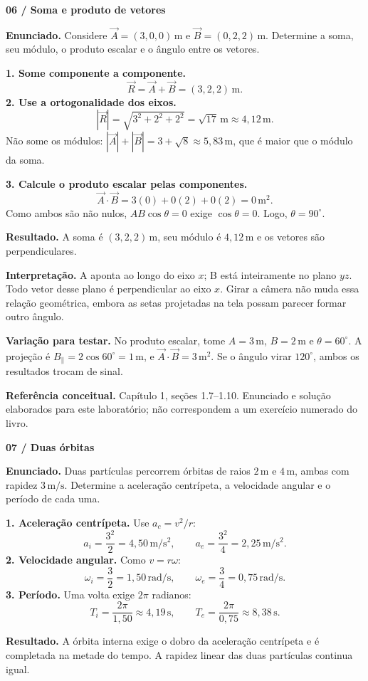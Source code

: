 \documentclass[11pt,a4paper]{article}
\newcommand{\result}[1]{\par\colorbox{pale}{\parbox{\dimexpr\linewidth-2\fboxsep}{\vspace{4pt}\textbf{Resultado.} #1\vspace{4pt}}}\par}
\newcommand{\exercise}[2]{{\LARGE\bfseries\color{ink}#1}\par\vspace{3pt}{\large #2}\par\vspace{5pt}}
\begin{document}
\newpage
\exercise{06 / Soma e produto de vetores}{Exercício adicional do laboratório}
\textbf{Enunciado.} Considere $\vec A=(3,0,0)\,\mathrm m$ e $\vec B=(0,2,2)\,\mathrm m$. Determine a soma, seu módulo, o produto escalar e o ângulo entre os vetores.

\textbf{1. Some componente a componente.}
\[
\vec R=\vec A+\vec B=(3,2,2)\,\mathrm m.
\]
\textbf{2. Use a ortogonalidade dos eixos.}
\[
|\vec R|=\sqrt{3^2+2^2+2^2}=\sqrt{17}\,\mathrm m\approx4{,}12\,\mathrm m.
\]
Não some os módulos: $|\vec A|+|\vec B|=3+\sqrt8\approx5{,}83\,\mathrm m$, que é maior que o módulo da soma.

\textbf{3. Calcule o produto escalar pelas componentes.}
\[
\vec A\cdot\vec B=3(0)+0(2)+0(2)=0\,\mathrm{m^2}.
\]
Como ambos são não nulos, $AB\cos\theta=0$ exige $\cos\theta=0$. Logo, $\theta=90^\circ$.
\result{A soma é $(3,2,2)\,\mathrm m$, seu módulo é $4{,}12\,\mathrm m$ e os vetores são perpendiculares.}

\textbf{Interpretação.} A aponta ao longo do eixo $x$; B está inteiramente no plano $yz$. Todo vetor desse plano é perpendicular ao eixo $x$. Girar a câmera não muda essa relação geométrica, embora as setas projetadas na tela possam parecer formar outro ângulo.

\textbf{Variação para testar.} No produto escalar, tome $A=3\,\mathrm m$, $B=2\,\mathrm m$ e $\theta=60^\circ$. A projeção é $B_\parallel=2\cos60^\circ=1\,\mathrm m$, e $\vec A\cdot\vec B=3\,\mathrm{m^2}$. Se o ângulo virar $120^\circ$, ambos os resultados trocam de sinal.

\textbf{Referência conceitual.} Capítulo 1, seções 1.7--1.10. Enunciado e solução elaborados para este laboratório; não correspondem a um exercício numerado do livro.

\newpage
\exercise{07 / Duas órbitas}{Exercício adicional do laboratório}
\textbf{Enunciado.} Duas partículas percorrem órbitas de raios $2\,\mathrm m$ e $4\,\mathrm m$, ambas com rapidez $3\,\mathrm{m/s}$. Determine a aceleração centrípeta, a velocidade angular e o período de cada uma.

\textbf{1. Aceleração centrípeta.} Use $a_c=v^2/r$:
\[
a_i=\frac{3^2}{2}=4{,}50\,\mathrm{m/s^2},\qquad
a_e=\frac{3^2}{4}=2{,}25\,\mathrm{m/s^2}.
\]
\textbf{2. Velocidade angular.} Como $v=r\omega$:
\[
\omega_i=\frac32=1{,}50\,\mathrm{rad/s},\qquad
\omega_e=\frac34=0{,}75\,\mathrm{rad/s}.
\]
\textbf{3. Período.} Uma volta exige $2\pi$ radianos:
\[
T_i=\frac{2\pi}{1{,}50}\approx4{,}19\,\mathrm s,\qquad
T_e=\frac{2\pi}{0{,}75}\approx8{,}38\,\mathrm s.
\]
\result{A órbita interna exige o dobro da aceleração centrípeta e é completada na metade do tempo. A rapidez linear das duas partículas continua igual.}
\end{document}
